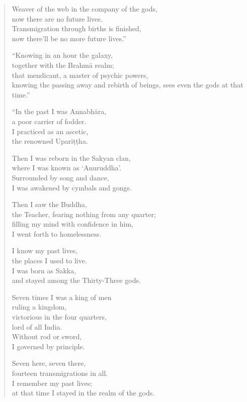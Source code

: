 \documentclass[12pt,openany]{book}%
\begin{document}
\begin{verse}
Weaver of the web in the company of the gods, \\
now there are no future lives. \\
Transmigration through births is finished, \\
now there’ll be no more future lives.” 

“Knowing in an hour the galaxy, \\
together with the \textsanskrit{Brahmā} realm; \\
that mendicant, a master of psychic powers, \\
knowing the passing away and rebirth of beings, sees even the gods at that time.” 

“In the past I was \textsanskrit{Annabhāra}, \\
a poor carrier of fodder. \\
I practiced as an ascetic, \\
the renowned \textsanskrit{Upariṭṭha}. 

Then I was reborn in the Sakyan clan, \\
where I was known as ‘Anuruddha’. \\
Surrounded by song and dance, \\
I was awakened by cymbals and gongs. 

Then I saw the Buddha, \\
the Teacher, fearing nothing from any quarter; \\
filling my mind with confidence in him, \\
I went forth to homelessness. 

I know my past lives, \\
the places I used to live. \\
I was born as Sakka, \\
and stayed among the Thirty-Three gods. 

Seven times I was a king of men \\
ruling a kingdom, \\
victorious in the four quarters, \\
lord of all India. \\
Without rod or sword, \\
I governed by principle. 

Seven here, seven there, \\
fourteen transmigrations in all. \\
I remember my past lives; \\
at that time I stayed in the realm of the gods. 


\end{verse}
\end{document}
